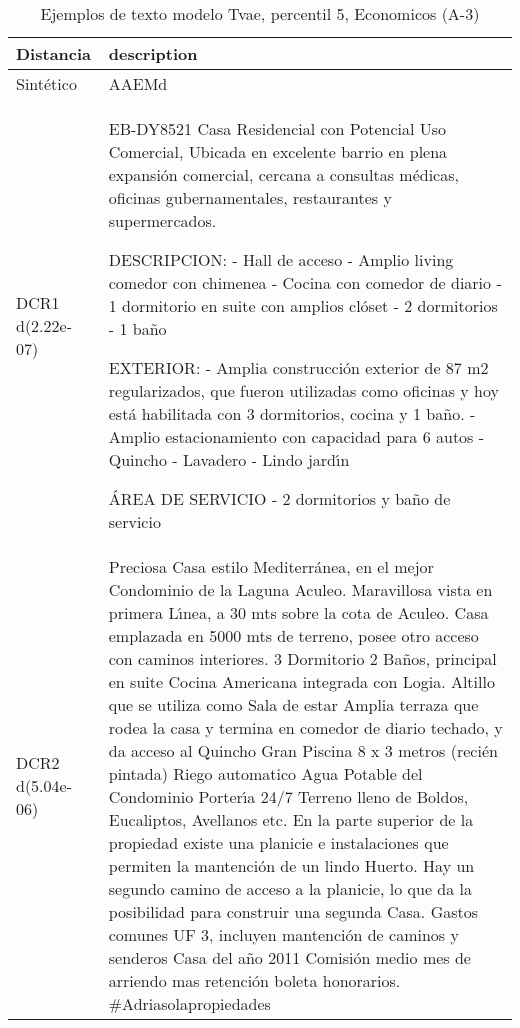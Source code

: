 \begin{table}[H]
\centering
\fontsize{10}{14}\selectfont
\caption{Ejemplos de texto modelo Tvae, percentil 5, Economicos (A-3)}
\label{table-example-economicos-a-3-tvae-5p-text}
\begin{tabular}{|l|m{35em}|}
\hline
\rowcolor[gray]{0.8}
Distancia & description \\
\hline Sintético & AAEMd \\
\hline DCR1 d(2.22e-07) & EB-DY8521
Casa Residencial con Potencial Uso Comercial, Ubicada en excelente barrio en plena expansi\'on comercial, cercana a consultas m\'edicas, oficinas gubernamentales, restaurantes y supermercados.

DESCRIPCION:
- Hall de acceso
- Amplio living comedor con chimenea
- Cocina con comedor de diario
- 1 dormitorio en suite con amplios cl\'oset
- 2 dormitorios
- 1 ba\~no

EXTERIOR:
- Amplia construcci\'on exterior de 87 m2 regularizados, que fueron utilizadas como oficinas y hoy est\'a habilitada con 3 dormitorios, cocina y 1 ba\~no. 
- Amplio estacionamiento con capacidad para 6 autos
- Quincho
- Lavadero 
- Lindo jard{\'\i}n

\'AREA DE SERVICIO
- 2 dormitorios y ba\~no de servicio \\
\hline DCR2 d(5.04e-06) & Preciosa Casa estilo Mediterr\'anea, en el mejor Condominio de la Laguna Aculeo. Maravillosa vista en primera L{\'\i}nea, a 30 mts sobre la cota de Aculeo. Casa emplazada en 5000 mts de terreno, posee otro acceso con caminos interiores. 3 Dormitorio 2 Ba\~nos, principal en suite  Cocina Americana integrada con Logia. Altillo que se utiliza como Sala de estar  Amplia terraza que rodea la casa y termina en comedor de diario techado, y da acceso al Quincho Gran Piscina 8 x 3 metros (reci\'en pintada) Riego automatico Agua Potable del Condominio Porter{\'\i}a 24/7 Terreno lleno de Boldos, Eucaliptos, Avellanos etc. En la parte superior de la propiedad existe una planicie e instalaciones que permiten la mantenci\'on de un lindo Huerto. Hay un segundo camino de acceso a la planicie, lo que da la posibilidad para construir una segunda Casa. Gastos comunes UF 3, incluyen mantenci\'on de caminos y senderos Casa del a\~no 2011 Comisi\'on medio mes de arriendo mas retenci\'on boleta honorarios.  \#Adriasolapropiedades \\
\hline
\end{tabular}
\end{table}
